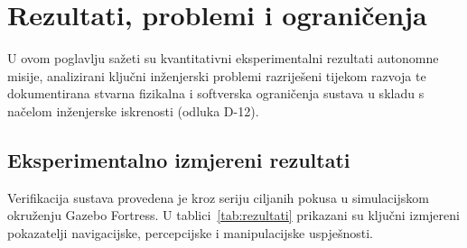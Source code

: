 \section{Rezultati, problemi i ograničenja}
\label{sec:09-rezultati}

U ovom poglavlju sažeti su kvantitativni eksperimentalni rezultati autonomne misije, analizirani
ključni inženjerski problemi razriješeni tijekom razvoja te dokumentirana stvarna fizikalna i
softverska ograničenja sustava u skladu s načelom inženjerske iskrenosti (odluka D-12).

\subsection{Eksperimentalno izmjereni rezultati}
\label{sec:09-mjerenja}

Verifikacija sustava provedena je kroz seriju ciljanih pokusa u simulacijskom okruženju Gazebo
Fortress. U tablici~\ref{tab:rezultati} prikazani su ključni izmjereni pokazatelji navigacijske,
percepcijske i manipulacijske uspješnosti.

